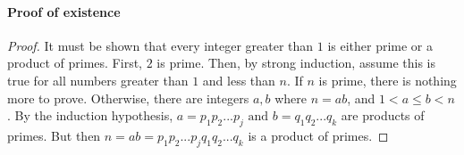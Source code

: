 \documentclass[../MathsNotesBase.tex]{subfiles}
\begin{document}
{%
%		

		\bigskip
		\paragraph{Proof of existence}
		\begin{proof}
			It must be shown that every integer greater than $ 1 $ is either prime or a product of primes. First, $ 2 $ is prime. Then, by strong induction, assume this is true for all numbers greater than $ 1 $ and less than $ n $. 
			If $ n $ is prime, there is nothing more to prove. 
			Otherwise, there are integers $ a, b $ where $ n = ab $, and $ 1 < a \leq b < n $. By the induction hypothesis, $ a = p_1p_2...p_j \text{ and } b = q_1q_2...q_k $ are products of primes. But then $ n = ab = p_1p_2...p_jq_1q_2...q_k $ is a product of primes.
		\end{proof}
}
\end{document}
